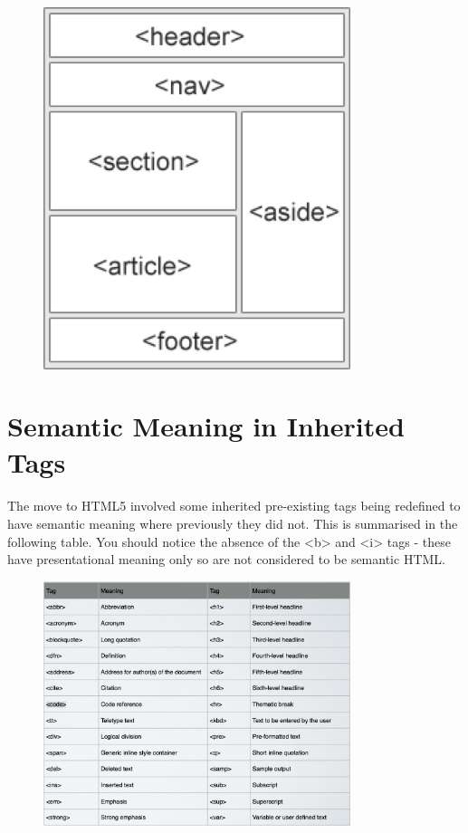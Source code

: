 \begin{figure}[H]
\centering
\includegraphics[width=0.8\textwidth]{figures/semantic-sections}
\label{fig:semantic-sections}
\caption{}
\end{figure}


\section{Semantic Meaning in Inherited Tags}
\paragraph{} The move to HTML5 involved some inherited pre-existing tags being redefined to have semantic meaning where previously they did not. This is summarised in the following table. You should notice the absence of the <b> and <i> tags - these have presentational meaning only so are not considered to be semantic HTML.


\begin{figure}[H]
\centering
\includegraphics[width=0.8\textwidth]{figures/semantic-tags}
\label{fig:semantic-tags}
\caption{}
\end{figure}


